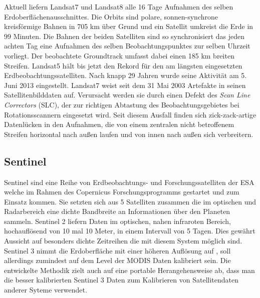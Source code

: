 \documentclass[11pt]{report}
\begin{document}
Aktuell liefern Landsat7  und Landsat8  alle 16 Tage Aufnahmen des selben Erdoberflächenausschnittes. Die Orbits sind polare, sonnen-synchrone kreisförmige Bahnen in 705 km über Grund und ein Satellit umkreist die Erde in 99 Minuten. Die Bahnen der beiden Satelliten sind so synchronisiert das jeden achten Tag eine Aufnahmen des selben Beobachtungspunktes zur selben Uhrzeit vorliegt. Der beobachtete Groundtrack umfasst dabei einen 185 km breiten Streifen.  Landsat5 hält bis jetzt den Rekord für den am längsten eingesetzten Erdbeobachtungssatelliten. Nach knapp 29 Jahren wurde seine Aktivität am 5. Juni 2013 eingestellt. Landsat7 weist seit dem 31 Mai 2003 Artefakte in seinen Satellitenbilddaten auf. Verursacht werden sie durch einen Defekt des \textit{Scan Line Correctors} (SLC), der zur richtigen Abtastung des Beobachtungsgebietes bei Rotationsscannern eingesetzt wird. Seit diesem Ausfall finden sich zick-zack-artige Datenlücken in den Aufnahmen, die von einem zentralen nicht betroffenem Streifen horizontal nach außen laufen und von innen nach außen sich verbreitern.

\subsection{Sentinel}
Sentinel sind eine Reihe von Erdbeobachtungs- und Forschungssatelliten der ESA welche im Rahmen des Copernicus Forschungsprogramms gestartet und zum Einsatz kommen. Sie setzten sich aus 5 Satelliten zusammen die im optischen und Radarbereich eine dichte Bandbreite an Informationen über den Planeten sammeln. Sentinel 2  liefern Daten im optischen, nahen infraroten Bereich, hochauflösend von 10 mal 10 Meter,  in einem Intervall von 5 Tagen. Dies gewährt Aussicht auf besonders dichte Zeitreihen die mit diesem System möglich sind. Sentinel 3  nimmt die Erdoberfläche mit einer höheren Auflösung auf , soll allerdings zumindest auf dem Level der MODIS Daten  kalibriert sein. Die entwickelte Methodik zielt auch auf eine portable Herangehensweise ab, dass man die besser kalibrierten Sentinel 3 Daten zum Kalibrieren von Satellitendaten anderer Syteme  verwendet.
\end{document}
